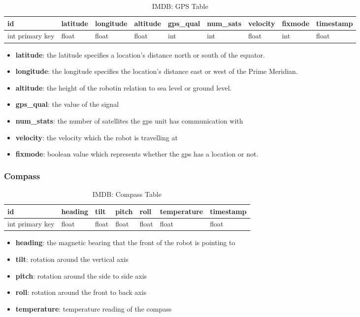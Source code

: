 \begin{table}[!htb]
\centering
\begin{tabular}{|l|l|l|l|l|l|l|l|l|}
\hline
id              & latitude & longitude & altitude & gps\_qual & num\_sats & velocity & fixmode & timestamp \\ \hline
int primary key & float    & float     & float    & int       & int       & float    & int     & float\\ \hline
\end{tabular}
\caption{IMDB: GPS Table}
\label{tab:db-gps}
\end{table}
\begin{itemize}
\item{\textbf{latitude}}: the latitude specifies a location's distance north or south of the equator.
\item{\textbf{longitude}}: the longitude specifies the location's distance east or west of the Prime Meridian.
\item{\textbf{altitude}}: the height of the robotin relation to sea level or ground level.
\item{\textbf{gps\_qual}}: the value of the signal
\item{\textbf{num\_stats}}: the number of satellites the gps unit has communication with
\item{\textbf{velocity}}: the velocity which the robot is travelling at
\item{\textbf{fixmode}}: boolean value which represents whether the gps has a location or not.  
\end{itemize}


\subsubsection{Compass}
\begin{table}[!htb]
\centering
\begin{tabular}{|l|l|l|l|l|l|l|}
\hline
id              & heading & tilt  & pitch & roll  & temperature & timestamp \\ \hline
int primary key & float   & float & float & float & float       & float \\ \hline
\end{tabular}
\caption{IMDB: Compass Table}
\label{tab:db-compass}
\end{table}
\begin{itemize}
\item{\textbf{heading}}: the magnetic bearing that the front of the robot is pointing to
\item{\textbf{tilt}}: rotation around the vertical axis
\item{\textbf{pitch}}: rotation around the side to side axis
\item{\textbf{roll}}: rotation around the front to back axis
\item{\textbf{temperature}}: temperature reading of the compass
\end{itemize}


